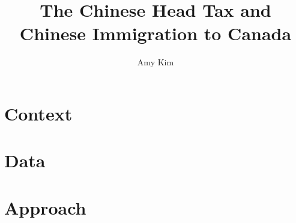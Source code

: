 \documentclass[12pt]{article}
\title{The Chinese Head Tax and Chinese Immigration to Canada}
\author{Amy Kim}
\begin{document}

\section{Context}

\section{Data}

\section{Approach}
\end{document}
